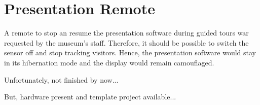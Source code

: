 %


\section{Presentation Remote}
\label{implementation_remote}

A remote to stop an resume the presentation software during guided tours war requested by the museum's staff. Therefore, it should be possible to switch the sensor off and stop tracking visitors. Hence, the presentation software would stay in its hibernation mode and the display would remain camouflaged.

Unfortunately, not finished by now...

But, hardware present and template project available...

